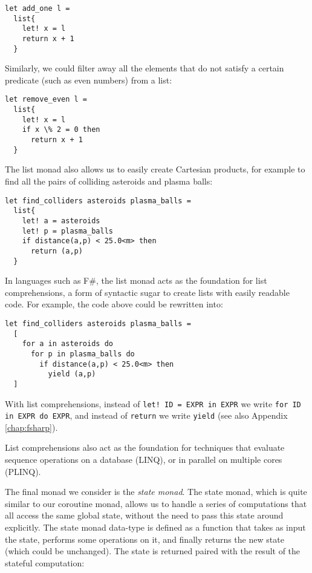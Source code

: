\begin{lstlisting}
let add_one l =
  list{
    let! x = l
    return x + 1
  }
\end{lstlisting}

Similarly, we could filter away all the elements that do not satisfy a certain predicate (such as even numbers) from a list:

\begin{lstlisting}
let remove_even l =
  list{
    let! x = l
    if x \% 2 = 0 then
      return x + 1
  }
\end{lstlisting}

The list monad also allows us to easily create Cartesian products, for example to find all the pairs of colliding asteroids and plasma balls:

\begin{lstlisting}
let find_colliders asteroids plasma_balls =
  list{
    let! a = asteroids
    let! p = plasma_balls
    if distance(a,p) < 25.0<m> then
      return (a,p)
  }
\end{lstlisting}

In languages such as F\#, the list monad acts as the foundation for list comprehensions, a form of syntactic sugar to create lists with easily readable code. For example, the code above could be rewritten into:

\begin{lstlisting}
let find_colliders asteroids plasma_balls =
  [
    for a in asteroids do
      for p in plasma_balls do
        if distance(a,p) < 25.0<m> then
          yield (a,p)
  ]
\end{lstlisting}

With list comprehensions, instead of \texttt{let! ID = EXPR in EXPR} we write \texttt{for ID in EXPR do EXPR}, and instead of \texttt{return} we write \texttt{yield} (see also Appendix \ref{chap:fsharp}).

List comprehensions also act as the foundation for techniques that evaluate sequence operations on a database (LINQ), or in parallel on multiple cores (PLINQ).

The final monad we consider is the \textit{state monad}. The state monad, which is quite similar to our coroutine monad, allows us to handle a series of computations that all access the same global state, without the need to pass this state around explicitly. The state monad data-type is defined as a function that takes as input the state, performs some operations on it, and finally returns the new state (which could be unchanged). The state is returned paired with the result of the stateful computation:

